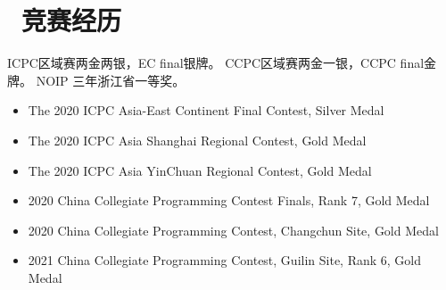 \section{\faStar\ 竞赛经历}
ICPC区域赛两金两银，EC final银牌。
CCPC区域赛两金一银，CCPC final金牌。
NOIP 三年浙江省一等奖。

\begin{itemize}
    \item The 2020 ICPC Asia-East Continent Final Contest, Silver Medal
    \item The 2020 ICPC Asia Shanghai Regional Contest, Gold Medal
    \item The 2020 ICPC Asia YinChuan Regional Contest, Gold Medal
    \item 2020 China Collegiate Programming Contest Finals, Rank 7, Gold Medal
    \item 2020 China Collegiate Programming Contest, Changchun Site, Gold Medal
    \item 2021 China Collegiate Programming Contest, Guilin Site, Rank 6, Gold Medal
\end{itemize}

